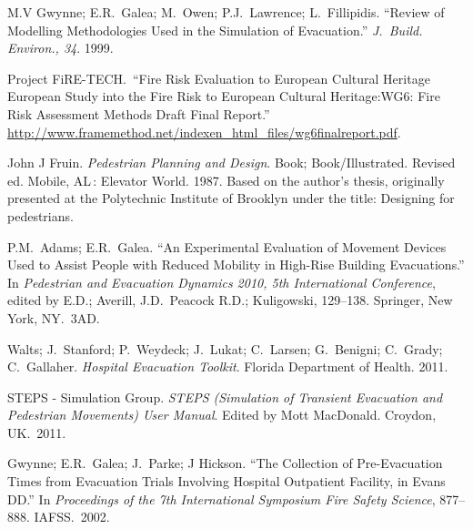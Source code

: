 \documentclass{style/llncs}
\begin{document}
{\begin{thebibliography}{36}
M.V Gwynne; E.R.~Galea; M.~Owen; P.J.~Lawrence; L.~Fillipidis. \textquotedblleft{}Review of Modelling Methodologies Used in the Simulation of Evacuation.\textquotedblright{} \emph{J.~Build. Environ., 34}. 1999.\label{5}%

Project FiRE-TECH.~\textquotedblleft{}Fire Risk Evaluation to European Cultural Heritage European Study into the Fire Risk to European Cultural Heritage:WG6: Fire Risk Assessment Methods Draft Final Report.\textquotedblright{} \href{http://www.framemethod.net/indexen_html_files/wg6finalreport.pdf}{{\ttfamily http://\hspace{0pt}www.\hspace{0pt}framemethod.\hspace{0pt}net/\hspace{0pt}indexen\_\hspace{0pt}html\_\hspace{0pt}files/\hspace{0pt}wg6finalreport.\hspace{0pt}pdf}}.\label{29}%

John J Fruin. \emph{Pedestrian Planning and Design}. Book; Book/Illustrated. Revised ed. Mobile, AL : Elevator World. 1987. Based on the author’s thesis, originally presented at the Polytechnic Institute of Brooklyn under the title: Designing for pedestrians.\label{22}%

P.M.~Adams; E.R.~Galea. \textquotedblleft{}An Experimental Evaluation of Movement Devices Used to Assist People with Reduced Mobility in High-Rise Building Evacuations.\textquotedblright{} In \emph{Pedestrian and Evacuation Dynamics 2010, 5th International Conference}, edited by E.D.; Averill, J.D.~Peacock R.D.; Kuligowski, 129–138. Springer, New York, NY.~3AD.\label{20}%

Walts; J.~Stanford; P.~Weydeck; J.~Lukat; C.~Larsen; G.~Benigni; C.~Grady; C.~Gallaher. \emph{Hospital Evacuation Toolkit}. Florida Department of Health. 2011.\label{37}%

STEPS - Simulation Group. \emph{STEPS (Simulation of Transient Evacuation and Pedestrian Movements) User Manual}. Edited by Mott MacDonald. Croydon, UK.~2011.\label{16}%

Gwynne; E.R.~Galea; J.~Parke; J Hickson. \textquotedblleft{}The Collection of Pre-Evacuation Times from Evacuation Trials Involving Hospital Outpatient Facility, in Evans DD.\textquotedblright{} In \emph{Proceedings of the 7th International Symposium Fire Safety Science}, 877–888. IAFSS.~2002.\label{35}%


\end{thebibliography}}
\end{document}
